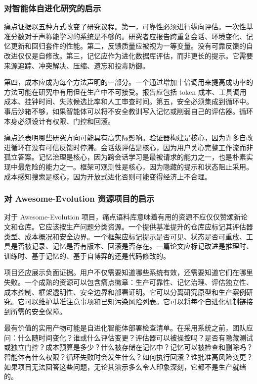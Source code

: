 \subsubsection{对智能体自进化研究的启示}
\label{sec:ch7-research-implications-english}

痛点证据以五种方式改变了研究议程。第一，可靠性必须进行纵向评估。一次性基准分数对于声称能学习的系统是不够的。研究者应报告跨重复会话、环境变化、记忆更新和回归套件的性能。第二，反馈质量应被视为一等变量。没有可靠反馈的自改进仅仅是自修改。第三，记忆应作为进化数据库评估，而非更长的提示。它需要来源追踪、冲突解决、压缩、遗忘和投毒防御。

第四，成本应成为每个方法声明的一部分。一个通过增加十倍调用来提高成功率的方法可能在研究中有用但在生产中不可接受。报告应包括 token 成本、工具调用成本、挂钟时间、失败候选比率和人工审查时间。第五，安全必须集成到循环中。事后沙箱不够，如果智能体可以将不安全教训写入记忆或削弱自己的评估器。循环本身必须设计有权限、门控和回滚。

痛点还表明哪些研究方向可能具有高实际影响。验证器构建是核心，因为许多自改进循环在没有可信反馈时停滞。会话级评估是核心，因为用户关心完整工作流而非孤立答案。记忆治理是核心，因为跨会话学习是最被请求的能力之一，也是朴素实现中最危险的能力之一。框架可观测性是核心，因为隐藏的提示和状态阻止采用。成本感知搜索是核心，因为开放式进化否则可能变得经济上不合理。

\subsubsection{对 Awesome-Evolution 资源项目的启示}
\label{sec:ch7-awesome-evolution-implications-english}

对于 Awesome-Evolution 项目，痛点语料库意味着有用的资源不应仅仅赞颂新论文和仓库。它应该按生产问题分类资源。一个提供基准提升的仓库应标记其评估器类型、成本概况和安全边界。一个框架应标记提示是否可见、状态是否可重放、工具是否被记录、记忆是否有版本、回滚是否存在。一篇论文应标记改进是推理时、训练时、基于记忆的、基于自博弈的还是代码修改的。

项目还应展示负面证据。用户不仅需要知道哪些系统有效，还需要知道它们在哪里失败。一个成熟的资源可以包含痛点徽章：生产可靠性、记忆治理、评估独立性、成本控制、框架透明性、安全边界和部署证明。它可以分离研究原型和生产案例研究。它可以维护基准注意事项和已知污染风险列表。它可以将每个自进化机制链接到所需的安全保障。

最有价值的实用产物可能是自进化智能体部署检查清单。在采用系统之前，团队应问：什么随时间变化？谁或什么评估变更？评估器可以被操控吗？是否有隐藏测试或独立门控？成本预算是多少？什么被存储在记忆中？记忆可以被检查和删除吗？智能体有什么权限？循环失败时会发生什么？如何执行回滚？谁批准高风险变更？如果项目无法回答这些问题，无论其演示多么令人印象深刻，它都不是生产就绪的。

